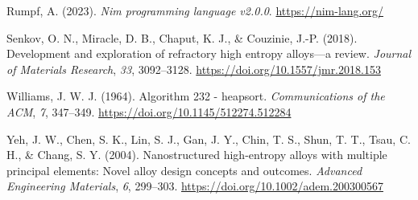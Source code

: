\documentclass[
]{article}
\newlength{\cslhangindent}
\newlength{\cslentryspacingunit} %
\newenvironment{CSLReferences}[2] %
 {%
  \setlength{\parindent}{0pt}
  \ifodd #1
  \let\oldpar\par
  \def\par{\hangindent=\cslhangindent\oldpar}
  \fi
  \setlength{\parskip}{#2\cslentryspacingunit}
 }%
 {}
\begin{document}
\begin{CSLReferences}{1}{0}
\leavevmode{}%
Rumpf, A. (2023). \emph{Nim programming language v2.0.0}.
\url{https://nim-lang.org/}

\leavevmode{}%
Senkov, O. N., Miracle, D. B., Chaput, K. J., \& Couzinie, J.-P. (2018).
Development and exploration of refractory high entropy alloys---a
review. \emph{Journal of Materials Research}, \emph{33}, 3092--3128.
\url{https://doi.org/10.1557/jmr.2018.153}

\leavevmode{}%
Williams, J. W. J. (1964). Algorithm 232 - heapsort.
\emph{Communications of the ACM}, \emph{7}, 347--349.
\url{https://doi.org/10.1145/512274.512284}

\leavevmode{}%
Yeh, J. W., Chen, S. K., Lin, S. J., Gan, J. Y., Chin, T. S., Shun, T.
T., Tsau, C. H., \& Chang, S. Y. (2004). Nanostructured high-entropy
alloys with multiple principal elements: Novel alloy design concepts and
outcomes. \emph{Advanced Engineering Materials}, \emph{6}, 299--303.
\url{https://doi.org/10.1002/adem.200300567}

\end{CSLReferences}
\end{document}
